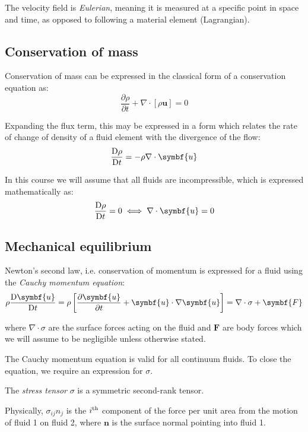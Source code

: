 \documentclass{jknotes}
\begin{document}
The velocity field is \emph{Eulerian}, meaning it is measured at a specific
point in space and time, as opposed to following a material element
(Lagrangian).

\subsection{Conservation of mass}

Conservation of mass can be expressed in the classical form of a conservation
equation as:
\begin{equation}
	\frac{\partial \rho}{\partial t} + \nabla \cdot \left[ \rho \symbf{u} \right]
	= 0
\end{equation}

Expanding the flux term, this may be expressed in a form which relates the
rate of change of density of a fluid element with the divergence of the
flow:
\begin{equation}
	\frac{\diffD{\rho}}{\diffD{t}} = -\rho \nabla \cdot \symbf{u}
\end{equation}

In this course we will assume that all fluids are incompressible, which is
expressed mathematically as:
\begin{equation}
	\frac{\diffD{\rho}}{\diffD{t}} = 0 \iff \nabla \cdot \symbf{u} = 0
\end{equation}

\subsection{Mechanical equilibrium}
Newton's second law, i.e. conservation of momentum is expressed for a fluid
using the \emph{Cauchy momentum equation}:
\begin{equation}
	\rho \frac{\diffD{\symbf{u}}}{\diffD{t}} = \rho \left[ \frac{\partial
	\symbf{u}}{\partial t} + \symbf{u} \cdot \nabla \symbf{u}\right] = \nabla \cdot
	\sigma + \symbf{F}
\end{equation}

where $\nabla \cdot \sigma$ are the surface forces acting on the fluid and
$\symbf{F}$ are body forces which we will assume to be negligible unless
otherwise stated.
 
The Cauchy momentum equation is valid for all continuum fluids. To close the
equation, we require an expression for $\sigma$.

\begin{defn}
The \emph{stress tensor} $\sigma$ is a symmetric second-rank tensor.
\begin{center}
\end{center}
Physically, $\sigma_{ij}n_j$ is the $i\textsuperscript{th}$ component of the force per
unit area from the motion of fluid 1 on fluid 2, where $\symbf{n}$ is the
surface normal pointing into fluid 1.
\end{defn}
\end{document}
